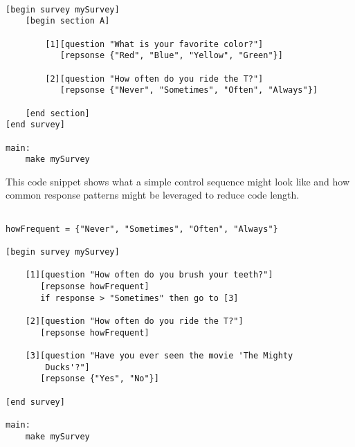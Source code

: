 \documentclass[12pt]{article}
\begin{document}
\begin{lstlisting}[frame=single]

[begin survey mySurvey]
    [begin section A]

        [1][question "What is your favorite color?"]
           [repsonse {"Red", "Blue", "Yellow", "Green"}]

        [2][question "How often do you ride the T?"]
           [repsonse {"Never", "Sometimes", "Often", "Always"}]

    [end section]
[end survey]

main:
    make mySurvey
\end{lstlisting}

\newpage
This code snippet shows what a simple control sequence might look like and how common response patterns might be
leveraged to reduce code length. \\

\begin{lstlisting}[frame=single]

howFrequent = {"Never", "Sometimes", "Often", "Always"}

[begin survey mySurvey]

    [1][question "How often do you brush your teeth?"]
       [repsonse howFrequent]
       if response > "Sometimes" then go to [3]

    [2][question "How often do you ride the T?"]
       [repsonse howFrequent]

    [3][question "Have you ever seen the movie 'The Mighty
        Ducks'?"]
       [repsonse {"Yes", "No"}]

[end survey]

main:
    make mySurvey
\end{lstlisting}
\end{document}
